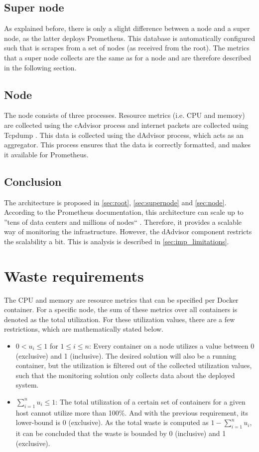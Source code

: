 \subsection{Super node} \label{sec:supernode}
As explained before, there is only a slight difference between a node and a super node, as the latter deploys Prometheus. This database is automatically configured such that is scrapes from a set of nodes (as received from the root). The metrics that a super node collects are the same as for a node and are therefore described in the following section.

\subsection{Node} \label{sec:node}
The node consists of three processes. Resource metrics (i.e. CPU and memory) are collected using the cAdvisor process and internet packets are collected using Tcpdump \cite{tcpdump}. This data is collected using the dAdvisor process, which acts as an aggregator. This process ensures that the data is correctly formatted, and makes it available for Prometheus.

\subsection{Conclusion}
The architecture is proposed in \autoref{sec:root}, \autoref{sec:supernode} and \autoref{sec:node}. According to the Prometheus documentation, this architecture can scale up to ''tens of data centers and millions of nodes`` \cite{prometheus_federation}. Therefore, it provides a scalable way of monitoring the infrastructure. However, the dAdvisor component restricts the scalability a bit. This is analysis is described in \autoref{sec:imp_limitations}.

\section{Waste requirements} \label{sec:waste_requirements}
The CPU and memory are resource metrics that can be specified per Docker container. For a specific node, the sum of these metrics over all containers is denoted as the total utilization. For these utilization values, there are a few restrictions, which are mathematically stated below.

\begin{itemize}
    \item $0 < u_i \leq 1$ for $1 \leq i \leq n$: Every container on a node utilizes a value between 0 (exclusive) and 1 (inclusive). The desired solution will also be a running container, but the utilization is filtered out of the collected utilization values, such that the monitoring solution only collects data about the deployed system.
    \item $\sum_{i=1}^n u_i \leq 1$: The total utilization of a certain set of containers for a given host cannot utilize more than 100\%. And with the previous requirement, its lower-bound is 0 (exclusive). As the total waste is computed as $1 - \sum_{i=1}^n u_i$, it can be concluded that the waste is bounded by 0 (inclusive) and 1 (exclusive).
\end{itemize}

